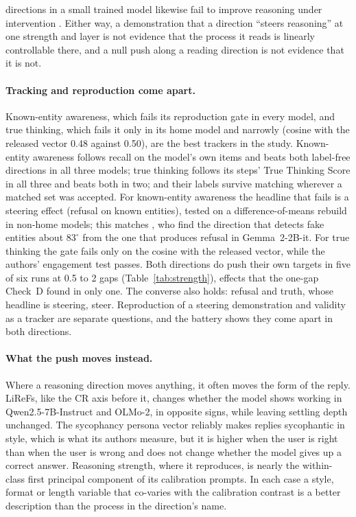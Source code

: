 \documentclass[11pt]{article}
\begin{document}
directions in a small trained model likewise fail to improve reasoning under intervention \citep{nwadike2026correctness}. Either way, a demonstration that a direction ``steers reasoning'' at one strength and layer is not evidence that the process it reads is linearly controllable there, and a null push along a reading direction is not evidence that it is not.

\paragraph{Tracking and reproduction come apart.} Known-entity awareness, which fails its reproduction gate in every model, and true thinking, which fails it only in its home model and narrowly (cosine with the released vector 0.48 against 0.50), are the best trackers in the study. Known-entity awareness follows recall on the model's own items and beats both label-free directions in all three models; true thinking follows its steps' True Thinking Score in all three and beats both in two; and their labels survive matching wherever a matched set was accepted. For known-entity awareness the headline that fails is a steering effect (refusal on known entities), tested on a difference-of-means rebuild in non-home models; this matches \citet{galeone2026detection}, who find the direction that detects fake entities about $83^\circ$ from the one that produces refusal in Gemma~2-2B-it. For true thinking the gate fails only on the cosine with the released vector, while the authors' engagement test passes. Both directions do push their own targets in five of six runs at 0.5 to 2 gaps (Table~\ref{tab:strength}), effects that the one-gap Check~D found in only one. The converse also holds: refusal and truth, whose headline is steering, steer. Reproduction of a steering demonstration and validity as a tracker are separate questions, and the battery shows they come apart in both directions.

\paragraph{What the push moves instead.} Where a reasoning direction moves anything, it often moves the form of the reply. LiReFs, like the CR axis before it, changes whether the model shows working in Qwen2.5-7B-Instruct and OLMo-2, in opposite signs, while leaving settling depth unchanged. The sycophancy persona vector reliably makes replies sycophantic in style, which is what its authors measure, but it is higher when the user is right than when the user is wrong and does not change whether the model gives up a correct answer. Reasoning strength, where it reproduces, is nearly the within-class first principal component of its calibration prompts. In each case a style, format or length variable that co-varies with the calibration contrast is a better description than the process in the direction's name.
\end{document}
